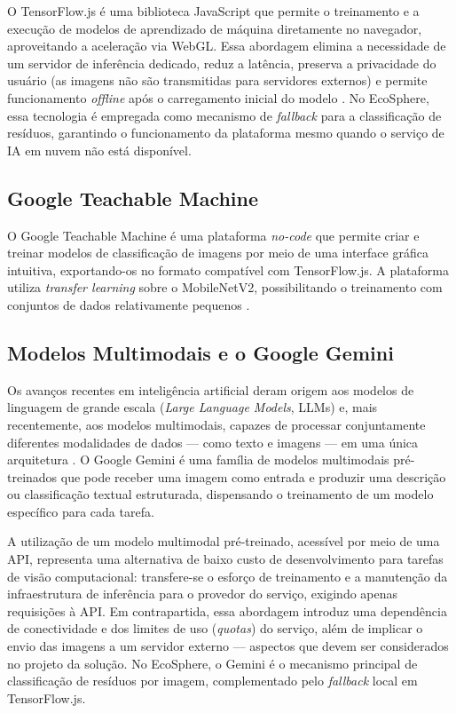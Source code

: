 \documentclass[
	12pt,
	openright,
	oneside,
	a4paper,
	chapter=TITLE,
	section=TITLE,
	subsection=TITLE,
	subsubsection=TITLE,
	english,
	brazil
	]{abntex2}
\begin{document}
O TensorFlow.js é uma biblioteca JavaScript que permite o treinamento e a execução de modelos de aprendizado de máquina diretamente no navegador, aproveitando a aceleração via WebGL. Essa abordagem elimina a necessidade de um servidor de inferência dedicado, reduz a latência, preserva a privacidade do usuário (as imagens não são transmitidas para servidores externos) e permite funcionamento \textit{offline} após o carregamento inicial do modelo \cite{SMILKOV2019}. No EcoSphere, essa tecnologia é empregada como mecanismo de \textit{fallback} para a classificação de resíduos, garantindo o funcionamento da plataforma mesmo quando o serviço de IA em nuvem não está disponível.

\subsection{Google Teachable Machine}

O Google Teachable Machine é uma plataforma \textit{no-code} que permite criar e treinar modelos de classificação de imagens por meio de uma interface gráfica intuitiva, exportando-os no formato compatível com TensorFlow.js. A plataforma utiliza \textit{transfer learning} sobre o MobileNetV2, possibilitando o treinamento com conjuntos de dados relativamente pequenos \cite{CARNEY2020}.

\subsection{Modelos Multimodais e o Google Gemini}

Os avanços recentes em inteligência artificial deram origem aos modelos de linguagem de grande escala (\textit{Large Language Models}, LLMs) e, mais recentemente, aos modelos multimodais, capazes de processar conjuntamente diferentes modalidades de dados — como texto e imagens — em uma única arquitetura \cite{GEMINI2023}. O Google Gemini é uma família de modelos multimodais pré-treinados que pode receber uma imagem como entrada e produzir uma descrição ou classificação textual estruturada, dispensando o treinamento de um modelo específico para cada tarefa.

A utilização de um modelo multimodal pré-treinado, acessível por meio de uma API, representa uma alternativa de baixo custo de desenvolvimento para tarefas de visão computacional: transfere-se o esforço de treinamento e a manutenção da infraestrutura de inferência para o provedor do serviço, exigindo apenas requisições à API. Em contrapartida, essa abordagem introduz uma dependência de conectividade e dos limites de uso (\textit{quotas}) do serviço, além de implicar o envio das imagens a um servidor externo — aspectos que devem ser considerados no projeto da solução. No EcoSphere, o Gemini é o mecanismo principal de classificação de resíduos por imagem, complementado pelo \textit{fallback} local em TensorFlow.js.
\end{document}
